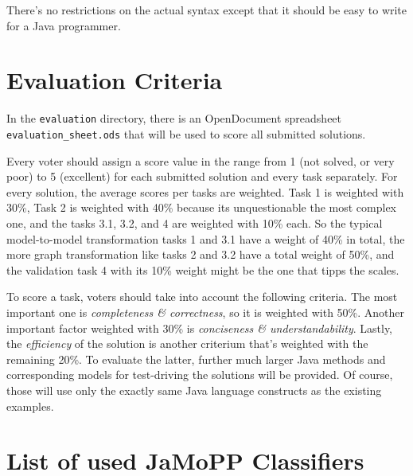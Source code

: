 \documentclass[11pt]{article}
\begin{document}
There's no restrictions on the actual syntax except that it should be easy to
write for a Java programmer.


\section{Evaluation Criteria}
\label{sec:evaluation-criteria}

In the \verb|evaluation| directory, there is an OpenDocument spreadsheet
\verb|evaluation_sheet.ods| that will be used to score all submitted solutions.

Every voter should assign a score value in the range from 1 (not solved, or
very poor) to 5 (excellent) for each submitted solution and every task
separately.  For every solution, the average scores per tasks are weighted.
Task 1 is weighted with 30\%, Task 2 is weighted with 40\% because its
unquestionable the most complex one, and the tasks 3.1, 3.2, and 4 are weighted
with 10\% each.  So the typical model-to-model transformation tasks 1 and 3.1
have a weight of 40\% in total, the more graph transformation like tasks 2 and
3.2 have a total weight of 50\%, and the validation task 4 with its 10\% weight
might be the one that tipps the scales.

To score a task, voters should take into account the following criteria.  The
most important one is \emph{completeness \& correctness}, so it is weighted
with 50\%.  Another important factor weighted with 30\% is \emph{conciseness \&
  understandability}.  Lastly, the \emph{efficiency} of the solution is another
criterium that's weighted with the remaining 20\%.  To evaluate the latter,
further much larger Java methods and corresponding models for test-driving the
solutions will be provided.  Of course, those will use only the exactly same
Java language constructs as the existing examples.






\appendix

\section{List of used JaMoPP Classifiers}
\label{sec:list-used-jamopp}
\end{document}
